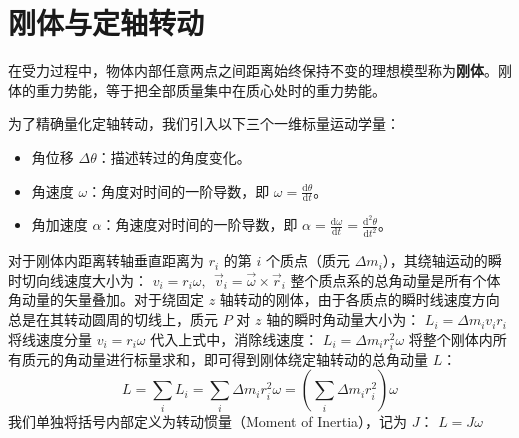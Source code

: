 \documentclass[lang=cn,11pt]{elegantbook}
\begin{document}
\section{刚体与定轴转动}

\begin{definition}[刚体]\label{def:rigid-body}
在受力过程中，物体内部任意两点之间距离始终保持不变的理想模型称为\textbf{刚体}。刚体的重力势能，等于把全部质量集中在质心处时的重力势能。
\end{definition}
为了精确量化定轴转动，我们引入以下三个一维标量运动学量：
\begin{itemize}
\item 角位移 $\Delta \theta$：描述转过的角度变化。
\item 角速度 $\omega$：角度对时间的一阶导数，即 $\omega = \frac{\mathrm{d}\theta}{\mathrm{d}t}$。
\item 角加速度 $\alpha$：角速度对时间的一阶导数，即 $\alpha = \frac{\mathrm{d}\omega}{\mathrm{d}t} = \frac{\mathrm{d}^2\theta}{\mathrm{d}t^2}$。
\end{itemize}
对于刚体内距离转轴垂直距离为 $r_i$ 的第 $i$ 个质点（质元 $\Delta m_i$），其绕轴运动的瞬时切向线速度大小为：
 \(v_i = r_i \omega,~~\vec{v}_i = \vec{\omega} \times \vec{r}_i\) 
整个质点系的总角动量是所有个体角动量的矢量叠加。对于绕固定 $z$ 轴转动的刚体，由于各质点的瞬时线速度方向总是在其转动圆周的切线上，质元 $P$ 对 $z$ 轴的瞬时角动量大小为： \(L_i = \Delta m_i v_i r_i\) 将线速度分量 $v_i = r_i \omega$ 代入上式中，消除线速度： \(L_i = \Delta m_i r_i^2 \omega\) 将整个刚体内所有质元的角动量进行标量求和，即可得到刚体绕定轴转动的总角动量 $L$：$$L = \sum_i L_i = \sum_i \Delta m_i r_i^2 \omega = \left( \sum_i \Delta m_i r_i^2 \right) \omega$$
我们单独将括号内部定义为转动惯量（Moment of Inertia），记为 $J$： \(\boxed{L = J\omega}\) 
\end{document}

